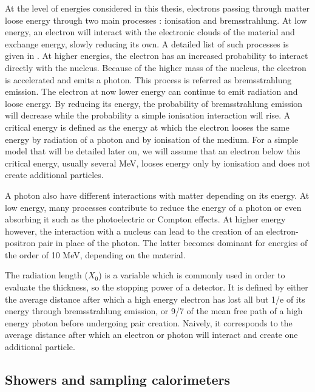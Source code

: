 At the level of energies considered in this thesis, electrons passing through matter loose energy through two main processes : ionisation and bremsstrahlung.
At low energy, an electron will interact with the electronic clouds of the material and exchange energy, slowly reducing its own.
A detailed list of such processes is given in \cite{PDG2016}.
At higher energies, the electron has an increased probability to interact directly with the nucleus.
Because of the higher mass of the nucleus, the electron is accelerated and emits a photon.
This process is referred as bremsstrahlung emission.
The electron at now lower energy can continue to emit radiation and loose energy.
By reducing its energy, the probability of bremsstrahlung emission will decrease while the probability a simple ionisation interaction will rise.
A critical energy is defined as the energy at which the electron looses the same energy by radiation of a photon and by ionisation of the medium.
For a simple model that will be detailed later on, we will assume that an electron below this critical energy, usually several MeV, looses energy only by ionisation and does not create additional particles.

A photon also have different interactions with matter depending on its energy.
At low energy, many processes contribute to reduce the energy of a photon or even absorbing it such as the photoelectric or Compton effects.
At higher energy however, the interaction with a nucleus can lead to the creation of an electron-positron pair in place of the photon.
The latter becomes dominant for energies of the order of 10 MeV, depending on the material.

The radiation length ($X_0$) is a variable which is commonly used in order to evaluate the thickness, so the stopping power of a detector.
It is defined by either the average distance after which a high energy electron has lost all but 1/e of its energy through bremsstrahlung emission, or 9/7 of the mean free path of a high energy photon before undergoing pair creation\cite{PDG2016}.
Naively, it corresponds to the average distance after which an electron or photon will interact and create one additional particle.

\subsection{Showers and sampling calorimeters}
\label{sec:org120de35}

